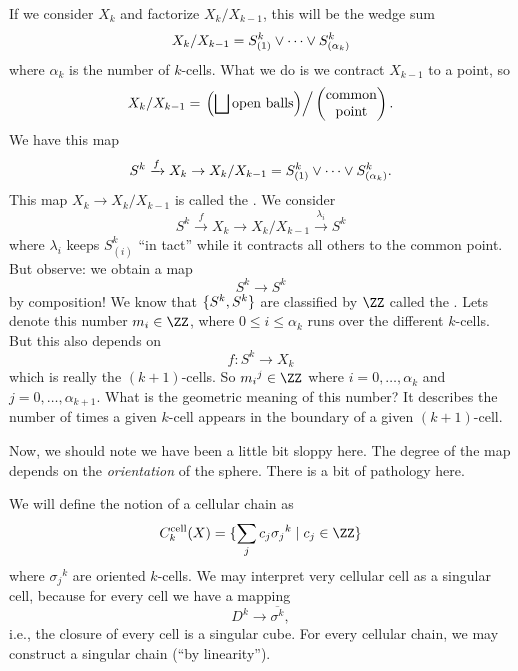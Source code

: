 If we consider $X_{k}$ and factorize $X_{k}/X_{k-1}$, this will
be the wedge sum
\begin{equation}
X_{k}/X_{k-1}=S^{k}_{(1)}\vee\dots\vee S^{k}_{(\alpha_{k})}
\end{equation}
where $\alpha_{k}$ is the number of $k$-cells. What we do is we
contract $X_{k-1}$ to a point, so
\begin{equation}
X_{k}/X_{k-1}=\left.\left(\bigsqcup\mbox{open balls}\right)\right/\begin{pmatrix}
\mbox{common}\\\mbox{point}
\end{pmatrix}.
\end{equation}
We have this map
\begin{equation}
S^{k}\xrightarrow{f}X_{k}\to X_{k}/X_{k-1}=S^{k}_{(1)}\vee\dots\vee S^{k}_{(\alpha_{k})}.
\end{equation}
This map $X_{k}\to X_{k}/X_{k-1}$ is called the
.
We consider
\begin{equation}
S^{k}\xrightarrow{f}X_{k}\to X_{k}/X_{k-1}\xrightarrow{\lambda_{i}}S^{k}
\end{equation}
where $\lambda_{i}$ keeps $S^{k}_{(i)}$ ``in tact'' while it
contracts all others to the common point. But observe: we obtain
a map
\begin{equation}
S^{k}\to S^{k}
\end{equation}
by composition! We know that $\homotopyClass(S^k,S^k)$ are
classified by $\ZZ$ called the
. Lets denote this number
$m_{i}\in\ZZ$, where $0\leq i\leq\alpha_{k}$ runs over the
different $k$-cells. But this also depends on
\begin{equation}
f\colon S^{k}\to X_{k}
\end{equation}
which is really the $(k+1)$-cells. So ${m_{i}}^{j}\in\ZZ$ where
$i=0,\dots,\alpha_{k}$ and $j=0,\dots,\alpha_{k+1}$.
What is the geometric meaning of this number? It describes the
number of times a given $k$-cell appears in the boundary of a
given $(k+1)$-cell.

Now, we should note we have been a little bit sloppy here. The
degree of the map depends on the \emph{orientation} of the
sphere. There is a bit of pathology here.

We will define the notion of a  cellular
chain
as
\begin{equation}
C^{\text{cell}}_{k}(X) = \{\sum_{j}c_{j}{\sigma_{j}}^{k}\mid c_{j}\in\ZZ\}
\end{equation}
where ${\sigma_{j}}^{k}$ are oriented $k$-cells. We may interpret
very cellular cell as a singular cell, because for every cell we
have a mapping
\begin{equation}
D^{k}\to\overline{\sigma^{k}},
\end{equation}
i.e., the closure of every cell is a singular cube. For every
cellular chain, we may construct a singular chain (``by linearity'').


